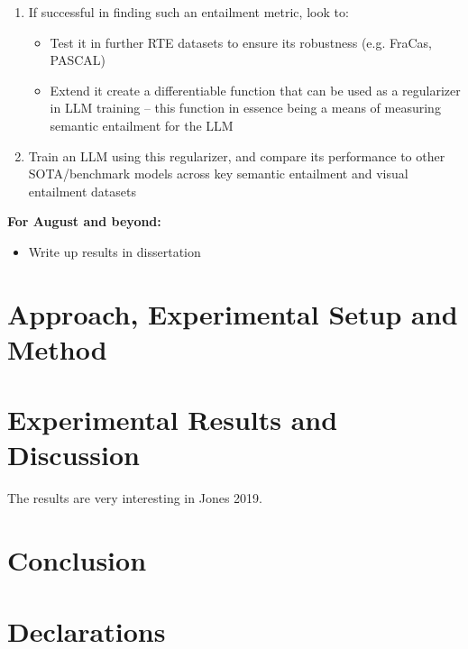 \documentclass[12pt,twoside]{report}
\begin{document}
\begin{enumerate}[itemsep=0pt]
\begin{itemize} [topsep=0pt, itemsep=0pt]
\begin{enumerate}[topsep=0pt, itemsep=0pt]
        \end{enumerate}
    \end{itemize}
    \item If successful in finding such an entailment metric, look to:
    \begin{itemize}[topsep=0pt, itemsep=0pt]
        \item Test it in further RTE datasets to ensure its robustness (e.g. FraCas, PASCAL)
        \item Extend it create a differentiable function that can be used as a regularizer in LLM training – this function in essence being a means of measuring semantic entailment for the LLM
    \end{itemize} 
    \item Train an LLM using this regularizer, and compare its performance to other SOTA/benchmark models across key semantic entailment and visual entailment datasets
\end{enumerate}
\textbf{For August and beyond:}
\begin{itemize} [itemsep=0pt]
    \item Write up results in dissertation
\end{itemize}
 




\chapter{Approach, 
Experimental Setup and Method}


\chapter{Experimental Results and Discussion}
The results are very interesting in Jones 2019.

\chapter{Conclusion}





\chapter*{Declarations}
\end{document}
